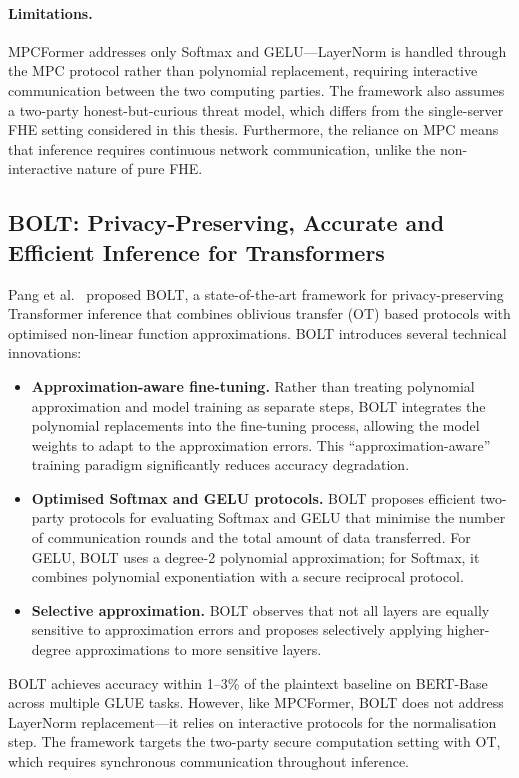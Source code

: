 \paragraph{Limitations.} MPCFormer addresses only Softmax and GELU---LayerNorm is handled through the MPC protocol rather than polynomial replacement, requiring interactive communication between the two computing parties. The framework also assumes a two-party honest-but-curious threat model, which differs from the single-server FHE setting considered in this thesis. Furthermore, the reliance on MPC means that inference requires continuous network communication, unlike the non-interactive nature of pure FHE.

\subsection{BOLT: Privacy-Preserving, Accurate and Efficient Inference for Transformers}
\label{sec:bolt}

Pang et al.~\cite{pang2024bolt} proposed BOLT, a state-of-the-art framework for privacy-preserving Transformer inference that combines oblivious transfer (OT) based protocols with optimised non-linear function approximations. BOLT introduces several technical innovations:

\begin{itemize}
    \item \textbf{Approximation-aware fine-tuning.} Rather than treating polynomial approximation and model training as separate steps, BOLT integrates the polynomial replacements into the fine-tuning process, allowing the model weights to adapt to the approximation errors. This ``approximation-aware'' training paradigm significantly reduces accuracy degradation.
    \item \textbf{Optimised Softmax and GELU protocols.} BOLT proposes efficient two-party protocols for evaluating Softmax and GELU that minimise the number of communication rounds and the total amount of data transferred. For GELU, BOLT uses a degree-2 polynomial approximation; for Softmax, it combines polynomial exponentiation with a secure reciprocal protocol.
    \item \textbf{Selective approximation.} BOLT observes that not all layers are equally sensitive to approximation errors and proposes selectively applying higher-degree approximations to more sensitive layers.
\end{itemize}

BOLT achieves accuracy within 1--3\% of the plaintext baseline on BERT-Base across multiple GLUE tasks. However, like MPCFormer, BOLT does not address LayerNorm replacement---it relies on interactive protocols for the normalisation step. The framework targets the two-party secure computation setting with OT, which requires synchronous communication throughout inference.

